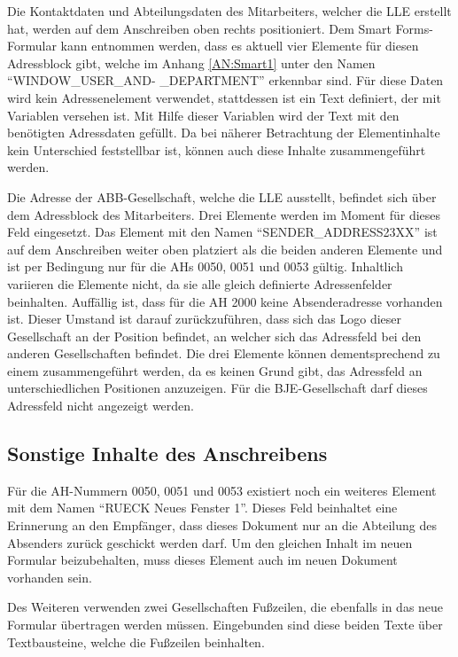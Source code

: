 	Die Kontaktdaten und Abteilungsdaten des Mitarbeiters, welcher die \ac{LLE} erstellt hat, werden auf dem Anschreiben oben rechts positioniert.
	Dem Smart Forms-Formular kann entnommen werden, dass es aktuell vier Elemente für diesen Adressblock gibt, welche im Anhang \ref{AN:Smart1} unter den Namen "`WINDOW\_USER\_AND-
	\_DEPARTMENT"' erkennbar sind. Für diese Daten wird kein Adressenelement verwendet, stattdessen ist ein Text definiert, der mit Variablen versehen ist. Mit Hilfe dieser Variablen wird der Text mit den benötigten Adressdaten gefüllt. Da bei näherer Betrachtung der Elementinhalte kein Unterschied feststellbar ist, können auch diese Inhalte zusammengeführt werden.
	
	Die Adresse der \ac{ABB}-Gesellschaft, welche die \ac{LLE} ausstellt, befindet sich über dem Adressblock des Mitarbeiters. Drei Elemente werden im Moment für dieses Feld eingesetzt. Das Element mit den Namen "`SENDER\_ADDRESS23XX"' ist auf dem Anschreiben weiter oben platziert als die beiden anderen Elemente und ist per Bedingung nur für die \ac{AH}s 0050, 0051 und 0053 gültig. Inhaltlich variieren die Elemente nicht, da sie alle gleich definierte Adressenfelder beinhalten. Auffällig ist, dass für die \ac{AH} 2000 keine Absenderadresse vorhanden ist. Dieser Umstand ist darauf zurückzuführen, dass sich das Logo dieser Gesellschaft an der Position befindet, an welcher sich das Adressfeld bei den anderen Gesellschaften befindet. Die drei Elemente können dementsprechend zu einem zusammengeführt werden, da es keinen Grund gibt, das Adressfeld an unterschiedlichen Positionen anzuzeigen. Für die \ac{BJE}-Gesellschaft darf dieses Adressfeld nicht angezeigt werden.
	
	\subsection{Sonstige Inhalte des Anschreibens}
	\label{ist:rueck}
	
	Für die \ac{AH}-Nummern 0050, 0051 und 0053 existiert noch ein weiteres Element mit dem Namen "`RUECK Neues Fenster 1"'. Dieses Feld beinhaltet eine Erinnerung an den Empfänger, dass dieses Dokument nur an die Abteilung des Absenders zurück geschickt werden darf. Um den gleichen Inhalt im neuen Formular beizubehalten, muss dieses Element auch im neuen Dokument vorhanden sein.
	
	Des Weiteren verwenden zwei Gesellschaften Fußzeilen, die ebenfalls in das neue Formular übertragen werden müssen. Eingebunden sind diese beiden Texte über Textbausteine, welche die Fußzeilen beinhalten.
	
